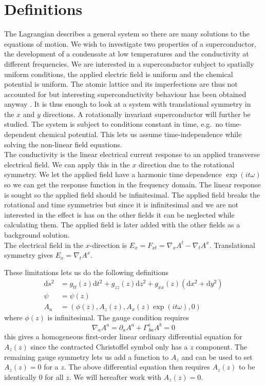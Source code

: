 \documentclass[12pt]{report}
\renewcommand{\d}{\ensuremath{\mathrm{d}}}
\renewcommand{\i}{\ensuremath{i}}
\newcommand{\At}{\ensuremath{{\phi}}}
\begin{document}
\section{Definitions}
The Lagrangian describes a general system so there are many solutions to the equations of motion. We wish to investigate two properties of a superconductor, the development of a condensate at low temperatures and the conductivity at different frequencies. We are interested in a superconductor subject to spatially uniform conditions, the applied electric field is uniform and the chemical potential is uniform. The atomic lattice and its imperfections are thus not accounted for but interesting superconductivity behaviour has been obtained anyway \cite{hartnoll9}. It is thus enough to look at a system with translational symmetry in the $x$ and $y$ directions. A rotationally invariant superconductor will further be studied. The system is subject to conditions constant in time, e.g.~no time-dependent chemical potential. This lets us assume time-independence while solving the non-linear field equations.\\

The conductivity is the linear electrical current response to an applied transverse electrical field. We can apply this in the $x$ direction due to the rotational symmetry. We let the applied field have a harmonic time dependence $\exp(\i t \omega)$ so we can get the response function in the frequency domain. The linear response is sought so the applied field should be infinitesimal. The applied field breaks the rotational and time symmetries but since it is infinitesimal and we are not interested in the effect is has on the other fields it can be neglected while calculating them. The applied field is later added with the other fields as a background solution.\\
The electrical field in the $x$-direction is $E_x=F_{xt}=\nabla_xA^t-\nabla_tA^x$. Translational symmetry gives $E_x=\nabla_tA^x$.

These limitations lets us do the following definitions
\begin{equation}
 \begin{split}
  \d s^2&=g_{tt}(z)\d t^2+g_{zz}(z)\d z^2+g_{xx}(z)(\d x^2+\d y^2)  \\
  \psi&=\psi(z)\\
  A_a&=(\At(z), A_z(z), A_x(z)\exp(\i t \omega), 0)
 \end{split}\label{defs}
\end{equation}
where $\At(z)$ is infinitesimal.
The gauge condition requires
\begin{equation}
 \nabla_aA^a=\partial_aA^a+\Gamma^a_{\ ba}A^b=0
\end{equation}
this gives a homogeneous first-order linear ordinary differential equation for $A_z(z)$ since the contracted Christoffel symbol only has a $z$ component. The remaining gauge symmetry lets us add a function to $A_z$ and can be used to set $A_z(z)=0$ for a $z$. The above differential equation then requires $A_z(z)$ to be identically 0 for all $z$. We will hereafter work with $A_z(z)=0$.\\
\end{document}

